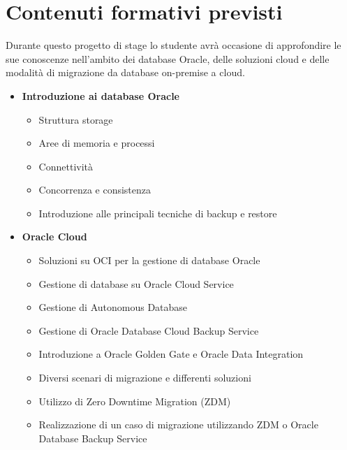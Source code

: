 \newpage
\section*{Contenuti formativi previsti}
Durante questo progetto di stage lo studente avrà occasione di approfondire le sue conoscenze nell'ambito dei database Oracle, delle soluzioni cloud e delle modalità di migrazione da database on-premise a cloud.

\begin{itemize}
    \item \textbf{Introduzione ai database Oracle}
    \begin{itemize}
        \item Struttura storage
        \item Aree di memoria e processi
        \item Connettività
        \item Concorrenza e consistenza
        \item Introduzione alle principali tecniche di backup e restore
    \end{itemize}
    \item \textbf{Oracle Cloud}
    \begin{itemize}
        \item Soluzioni su OCI per la gestione di database Oracle
        \item Gestione di database su Oracle Cloud Service
        \item Gestione di Autonomous Database
        \item Gestione di Oracle Database Cloud Backup Service
        \item Introduzione a Oracle Golden Gate e Oracle Data Integration
        \item Diversi scenari di migrazione e differenti soluzioni
        \item Utilizzo di Zero Downtime Migration (ZDM)
        \item Realizzazione di un caso di migrazione utilizzando ZDM o Oracle Database Backup Service
    \end{itemize}
\end{itemize}


\newpage